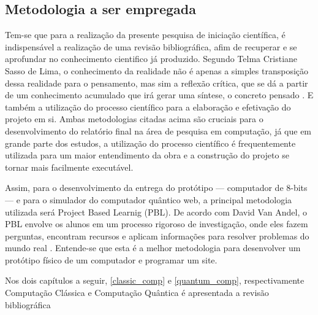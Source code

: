 \subsection{Metodologia a ser empregada}
Tem-se que para a realização da presente pesquisa de iniciação científica, é indispensável a realização de uma revisão bibliográfica, afim de recuperar e se aprofundar no conhecimento cientifico já produzido. Segundo Telma Cristiane Sasso de Lima, o conhecimento da realidade não é apenas a simples transposição dessa realidade para o pensamento, mas sim a reflexão crítica, que se dá a partir de um conhecimento acumulado que irá gerar uma síntese, o concreto pensado \cite{1}. E também a utilização do processo científico para a elaboração e efetivação do projeto em si. Ambas metodologias citadas acima são cruciais para o desenvolvimento do relatório final na área de pesquisa em computação, já que em grande parte dos estudos, a utilização do processo científico é frequentemente utilizada para um maior entendimento da obra e a construção do projeto se tornar mais facilmente executável.

Assim, para o desenvolvimento da entrega do protótipo — computador de 8-bits — e para o simulador do computador quântico web, a principal metodologia utilizada será Project Based Learnig (PBL). De acordo com David Van Andel, o PBL envolve os alunos em um processo rigoroso de investigação, onde eles fazem perguntas, encontram recursos e aplicam informações para resolver problemas do mundo real \cite{3}. Entende-se que esta é a melhor metodologia para desenvolver um protótipo físico de um computador e programar um site.

Nos dois capítulos a seguir, \ref{classic_comp} e \ref{quantum_comp}, respectivamente Computação Clássica e Computação Quântica é apresentada a revisão bibliográfica 


\newpage

